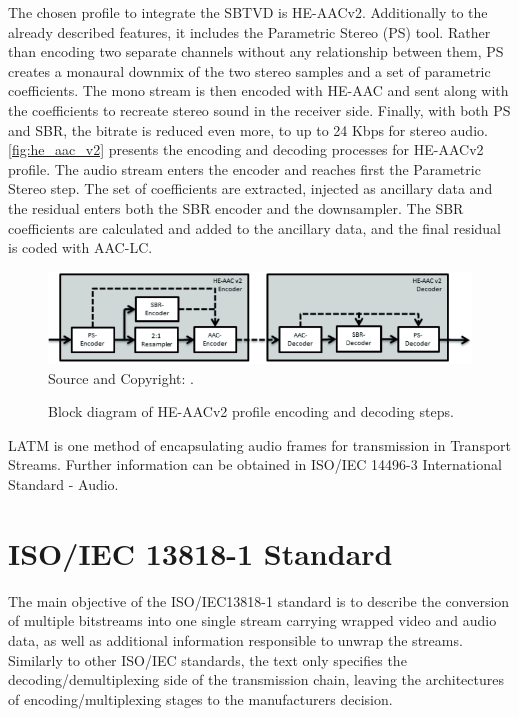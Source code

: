 \documentclass[
	12pt,				%
	openright,			%
	twoside,			%
	a4paper,			%
	brazil,
	french,				%
	english
	]{abntex2}
\begin{document}
The chosen profile to integrate the SBTVD is HE-AACv2. Additionally to the already described features, it includes the Parametric Stereo (PS) tool. Rather than encoding two separate channels without any relationship between them, PS creates a monaural downmix of the two stereo samples and a set of parametric coefficients. The mono stream is then encoded with HE-AAC and sent along with the coefficients to recreate stereo sound in the receiver side. Finally, with both PS and SBR, the bitrate is reduced even more, to up to 24 Kbps for stereo audio. \autoref{fig:he_aac_v2} presents the encoding and decoding processes for HE-AACv2 profile. The audio stream enters the encoder and reaches first the Parametric Stereo step. The set of coefficients are extracted, injected as ancillary data and the residual enters both the SBR encoder and the downsampler. The SBR coefficients are calculated and added to the ancillary data, and the final residual is coded with AAC-LC.

\begin{figure}
\centering
\caption{Block diagram of HE-AACv2 profile encoding and decoding steps.}
\includegraphics[width=1\linewidth]{figuras/he_aac_v2.png}
\\Source and Copyright: \cite{fraunhofer}.
\label{fig:he_aac_v2}
\end{figure}

LATM is one method of encapsulating audio frames for transmission in Transport Streams. Further information can be obtained in ISO/IEC 14496-3 International Standard - Audio.

\chapter{ISO/IEC 13818-1 Standard}
\label{iso13818}
The main objective of the ISO/IEC13818-1 standard is to describe the conversion of multiple bitstreams into one single stream carrying wrapped video and audio data, as well as additional information responsible to unwrap the streams. Similarly to other ISO/IEC standards, the text only specifies the decoding/demultiplexing side of the transmission chain, leaving the architectures of encoding/multiplexing stages to the manufacturers decision.
\end{document}
